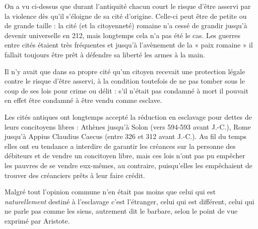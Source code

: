 On a vu ci-dessus que durant l'antiquité chacun court le risque
d'être asservi par la violence dès qu'il s'éloigne de sa cité d'origine. Celle-ci
peut être de petite ou de grande taille : la cité (et la citoyenneté) romaine
n'a cessé de grandir jusqu'à devenir universelle en 212, mais longtemps
cela n'a pas été le cas. Les guerres entre cités étaient très fréquentes
et jusqu'à l'avènement de la « paix romaine » il fallait toujours être prêt
à défendre sa liberté les armes à la main.

Il n'y avait que dans sa propre cité qu'un citoyen recevait une protection
légale contre le risque d'être asservi, à la condition toutefois de ne
pas tomber sous le coup de ses lois pour crime ou délit : s'il n'était pas
condamné à mort il pouvait en effet être condamné à être vendu comme
esclave.

Les cités antiques ont longtemps accepté la réduction en esclavage
pour dettes de leurs concitoyens libres : Athènes jusqu'à \hbox{Solon} (vers
594-593 avant J.-C.), Rome jusqu'à \hbox{Appius} \hbox{Claudius} \hbox{Caecus} (entre 326 et 312
avant J.-C.). Au fil du temps elles ont eu tendance a interdire de garantir
les créances sur la personne des débiteurs et de vendre un concitoyen libre, mais ces lois n'ont pas pu empêcher les pauvres de se vendre eux-mêmes,
au contraire, puisqu'elles les empêchaient de trouver des créanciers prêts
à leur faire crédit. 

Malgré tout l'opinion commune n'en était pas moins que celui
qui est \emph{naturellement} destiné à l'esclavage c'est l'étranger, celui qui est différent,
celui qui ne parle pas comme les siens, autrement dit le barbare, selon
le point de vue exprimé par Aristote.
